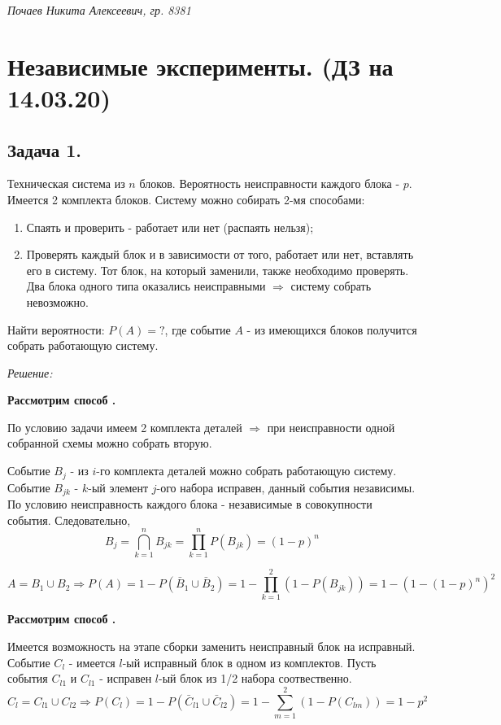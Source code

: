 



\textit{Почаев Никита Алексеевич, гр. 8381}

\section*{Независимые эксперименты. (ДЗ на 14.03.20)}

\subsection*{Задача 1.}

Техническая система из $n$ блоков. Вероятность неисправности каждого блока - $p$. Имеется 2 комплекта блоков. Систему можно собирать 2-мя способами: 
\begin{enumerate}
	\item Спаять и проверить - работает или нет (распаять нельзя);
	\item Проверять каждый блок и в зависимости от того, работает или нет, вставлять его в систему. Тот блок, на который заменили, также необходимо проверять. Два блока одного типа оказались неисправными $\Rightarrow$ систему собрать невозможно.
\end{enumerate}
Найти вероятности: $P(A) = ?$, где событие $A$ - из имеющихся блоков получится собрать работающую систему.

\textit{Решение:}

\textbf{Рассмотрим способ .}

По условию задачи имеем 2 комплекта деталей $\Rightarrow$ при неисправности одной собранной схемы можно собрать вторую.

Событие $B_j$ - из $i$-го комплекта деталей можно собрать работающую систему. Событие $B_{jk}$ - $k$-ый элемент $j$-ого набора исправен, данный события независимы. По условию неисправность каждого блока - независимые в совокупности события. Следовательно,
\[ B_j = \bigcap\limits_{k=1}^{n} B_{jk} = \prod_{k=1}^{n} P(B_{jk}) = (1-p)^n \]

\[ A = B_1 \cup B_2 \Rightarrow P(A) = 1 - P(\bar B_1 \cup \bar B_2) = 1 - \prod_{k=1}^2 (1 - P(B_{jk})) = 1 - (1 - (1-p)^n)^2 \]

\textbf{Рассмотрим способ .}

Имеется возможность на этапе сборки заменить неисправный блок на исправный. Событие $C_l$ - имеется $l$-ый исправный блок в одном из комплектов. Пусть события $C_{l1}$ и $C_{l1}$ - исправен $l$-ый блок из 1/2 набора соотвественно.
\[ C_l = C_{l1} \cup C_{l2} \Rightarrow P(C_l) = 1 - P(\bar C_{l1} \cup \bar C_{l2}) = 1 - \sum_{m=1}^{2} (1-P(C_{lm})) = 1 - p^2 \]

